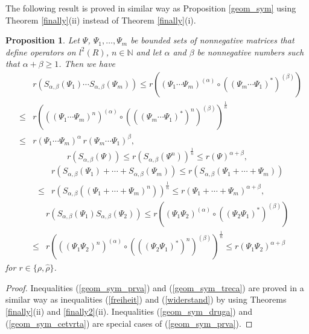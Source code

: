 \documentclass[12pt, reqno]{amsart}
\newtheorem{proposition}[theorem]{Proposition}
\theoremstyle{definition}
\theoremstyle{remark}
\numberwithin{equation}{section}
\newcommand{\be}{\begin{equation}}
\newcommand{\ee}{\end{equation}}
\begin{document}
The following result is proved in similar way as Proposition \ref{geom_sym} using Theorem \ref{finally}(ii) instead of Theorem \ref{finally}(i).
\begin{proposition}
Let $\Psi$, $\Psi_1, \ldots ,\Psi_m$ be bounded sets of nonnegative matrices that define operators on $l^2(R)$, $n \in \mathbb{N}$ and let $\alpha$ and $\beta$ be nonnegative numbers such that $\alpha+\beta \ge 1$. Then we have
\begin{eqnarray}
\nonumber
& & r(S_{\alpha ,\beta} (\Psi_{1}) \cdots  S_{\alpha  ,\beta}(\Psi_{m})) 
\le  r\left((\Psi_1 \cdots \Psi_m )^{(\alpha)} \circ ((\Psi_m \cdots \Psi_1)^*)^{(\beta)}  \right) \\
\nonumber
&\le & r\left(((\Psi_1 \cdots \Psi_m )^n)^{(\alpha)} \circ (((\Psi_m \cdots \Psi_1)^*)^n)^{(\beta)}\right)^{\frac{1}{n}}\\
&\le &  r(\Psi_1 \cdots \Psi_m )^{\alpha} \,  r(\Psi_m \cdots \Psi_1 )^{\beta},
\label{geom_sym_prva}
\end{eqnarray}
\be r(S_{\alpha, \beta}(\Psi)) \le r(S_{\alpha, \beta}(\Psi ^n))^{\frac{1}{n}}\le r(\Psi)^{\alpha+\beta},
\label{geom_sym_druga}
\ee
\begin{eqnarray}
\nonumber
& & r(S_{\alpha  ,\beta}(\Psi_1)+ \cdots + S_{\alpha  ,\beta}(\Psi_m)) \le r\left(S_{\alpha  ,\beta}(\Psi_1+ \cdots+ \Psi_m)\right) \\
&\le & r\left(S_{\alpha  ,\beta}((\Psi_1+ \cdots+ \Psi_m)^{n})\right)^{\frac{1}{n}} \le r(\Psi_1+ \cdots+ \Psi_m)^{\alpha + \beta},
\label{geom_sym_treca}
\end{eqnarray}
\begin{eqnarray}
\nonumber
& & r(S_{\alpha ,\beta}(\Psi_1)S_{\alpha ,\beta}(\Psi_2))\le r\left((\Psi_1 \Psi_2 )^{(\alpha)} \circ ((\Psi_2 \Psi_1)^*)^{(\beta)}  \right) \\
&\le & r\left(((\Psi_1 \Psi_2 )^n)^{(\alpha)} \circ (((\Psi_2 \Psi_1)^*)^n)^{(\beta)}\right)^{\frac{1}{n}}
\le r(\Psi_1\Psi_2)^{\alpha+\beta}
\label{geom_sym_cetvrta}
\end{eqnarray}
for $r \in \{ \rho, \hat{\rho}\}$.
\end{proposition}
\begin{proof}
Inequalities (\ref{geom_sym_prva}) and (\ref{geom_sym_treca}) are proved in a similar way as inequalities (\ref{freiheit}) and (\ref{widerstand}) by using Theorems \ref{finally}(ii) and \ref{finally2}(ii). %
Inequalities (\ref{geom_sym_druga}) and (\ref{geom_sym_cetvrta}) are special cases of (\ref{geom_sym_prva}).
\end{proof}
\end{document}
